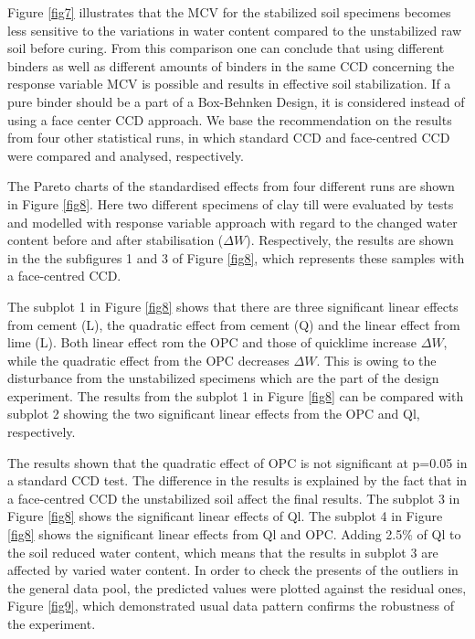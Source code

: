 \documentclass[eprint,
]{actapoly}
\begin{document}
Figure \ref{fig7} illustrates that the MCV for the stabilized soil specimens becomes less sensitive to the variations in water content compared to the unstabilized raw soil before curing. From this comparison one can conclude that using different binders as well as different amounts of binders in the same CCD concerning the response variable MCV is possible and results in effective soil stabilization. If a pure binder should be a part of a Box-Behnken Design, it is considered instead of using a face center CCD approach. We base the recommendation on the results from four other statistical runs, in which standard CCD and face-centred CCD were compared and analysed, respectively. 

The Pareto charts of the standardised effects from four different runs are shown in Figure \ref{fig8}. Here two different specimens of clay till were evaluated by tests and modelled with response variable approach with regard to the changed water content before and after stabilisation ($\Delta W$). Respectively, the results are shown in the the subfigures 1 and 3 of Figure \ref{fig8}, which represents these samples with a face-centred CCD. 

The subplot 1 in Figure \ref{fig8} shows that there are three significant linear effects from cement (L), the quadratic effect from cement (Q) and the linear effect from lime (L). Both linear effect rom the OPC and those of quicklime increase $\Delta W$, while the quadratic effect from the OPC decreases $\Delta W$. This is owing to the disturbance from the unstabilized specimens which are the part of the design experiment. The results from the subplot 1 in Figure \ref{fig8} can be compared with subplot 2 showing the two significant linear effects from the OPC and Ql, respectively. 

The results shown that the quadratic effect of OPC is not significant at p=0.05 in a standard CCD test. The difference in the results is explained by the fact that in a face-centred CCD the unstabilized soil affect the final results. The subplot 3 in Figure \ref{fig8} shows the significant linear effects of Ql. The subplot 4 in Figure \ref{fig8} shows the significant linear effects from Ql and OPC. Adding 2.5\% of Ql to the soil reduced water content, which means that the results in subplot 3 are affected by varied water content. In order to check the presents of the outliers in the general data pool, the predicted values were plotted against the residual ones, Figure \ref{fig9}, which demonstrated usual data pattern confirms the robustness of the experiment. 
\end{document}
